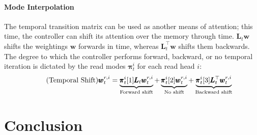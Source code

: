 \documentclass[]{article}
\begin{document}
\paragraph{Mode Interpolation} The temporal transition matrix can be used as another means of attention; this time, the controller can shift its attention over the memory through time. $\pmb{L}_t \pmb{w}$ shifts the weightings $\pmb{w}$ forwards in time, whereas $\pmb{L}_t^\top \pmb{w}$ shifts them backwards. The degree to which the controller performs forward, backward, or no temporal iteration is dictated by the read modes $\pmb{\pi}_t^i$ for each read head $i$:
\[
\tag{Temporal Shift}
\pmb{w}_t^{r,i} = 
\underbrace{\pmb{\pi}_t^i[1] \pmb{L}_t\pmb{w}_t^{r,i}}_{\text{\scriptsize Forward shift}} + 
\underbrace{\pmb{\pi}_t^i[2] \pmb{w}_t^{r,i}}_{\text{\scriptsize No shift}} + 
\underbrace{\pmb{\pi}_t^i[3] \pmb{L}_t^\top \pmb{w}_t^{r,i}}_{\text{\scriptsize Backward shift}}
\]

\section{Conclusion}
\end{document}
